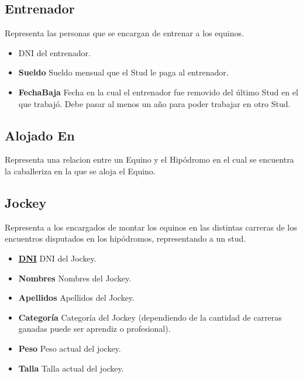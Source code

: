 \documentclass[a4paper,11pt]{article}
\begin{document}
\subsection{Entrenador}

Representa las personas que se encargan de entrenar a los equinos.

\begin{itemize}

  \item \textbf{\uline{}} DNI del entrenador.

  \item \textbf{Sueldo} Sueldo mensual que el Stud le paga al entrenador.

  \item \textbf{FechaBaja} Fecha en la cual el entrenador fue removido del 
    último Stud en el que trabajó. Debe pasar al menos un año para poder
    trabajar en otro Stud. 
  
\end{itemize}

\subsection{Alojado En}

Representa una relacion entre un Equino y el Hipódromo en el cual
se encuentra la caballeriza en la que se aloja el Equino.

\subsection{Jockey}

Representa a los encargados de montar los equinos en las distintas carreras 
de los encuentros disputados en los hipódromos, representando a un stud.

\begin{itemize}

  \item \textbf{\uline{DNI}} DNI del Jockey.
  
  \item \textbf{Nombres} Nombres del Jockey.
  
  \item \textbf{Apellidos} Apellidos del Jockey.

  \item \textbf{Categoría} Categoría del Jockey (dependiendo de la cantidad
  de carreras ganadas puede ser aprendiz o profesional).
  
  \item \textbf{Peso} Peso actual del jockey.
  
  \item \textbf{Talla} Talla actual del jockey.  
  
\end{itemize}
\end{document}

